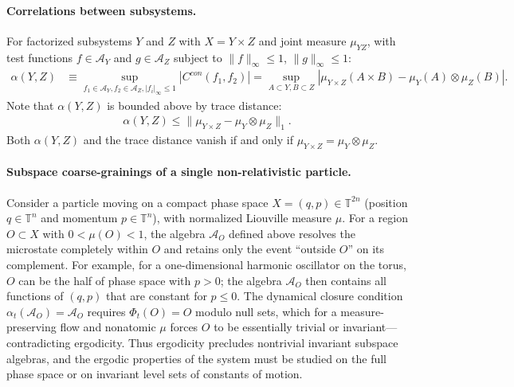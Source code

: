 \documentclass[a4paper,11pt]{article}
\theoremstyle{definition}
\theoremstyle{remark}
\newcommand{\mA}{\mathcal{A}}
\begin{document}
\paragraph{Correlations between subsystems.}
For factorized subsystems $Y$ and $Z$ with $X=Y\times Z$ and joint measure $\mu_{YZ}$,
with test functions $f\in\mathcal{A}_Y$ and $g\in\mathcal{A}_Z$ subject to
$\|f\|_\infty\le1$, $\|g\|_\infty\le1$:
\begin{align}
     \alpha(Y,Z)&\equiv \sup_{f_1\in \mA_Y, f_2\in \mA_Z, |f_i|_\infty\leq 1}|C^{con}(f_1,f_2)|
     =\sup_{A\subset Y,B\subset Z}|\mu_{Y\times Z}(A\times B)-\mu_Y(A)\otimes \mu_Z(B)|.
\end{align}
Note that $\alpha(Y,Z)$ is bounded above by trace distance:
\begin{align}
    \alpha(Y,Z)\leq \|\mu_{Y\times Z}-\mu_Y\otimes \mu_Z\|_1.
\end{align}
Both $\alpha(Y,Z)$ and the trace distance vanish if and only if $\mu_{Y\times Z}=\mu_Y\otimes\mu_Z$.
 
\paragraph{Subspace coarse-grainings of a single non-relativistic particle.}
Consider a particle moving on a compact phase space $X=(q,p)\in\mathbb{T}^{2n}$
(position $q\in\mathbb{T}^n$ and momentum $p\in\mathbb{T}^n$), with normalized
Liouville measure $\mu$.  For a region $O\subset X$ with $0<\mu(O)<1$, the algebra
$\mA_O$ defined above resolves the microstate completely within $O$ and retains only
the event ``outside $O$'' on its complement.  For example, for a one-dimensional
harmonic oscillator on the torus, $O$ can be the half of phase space with $p>0$; the
algebra $\mA_O$ then contains all functions of $(q,p)$ that are constant for $p\le0$.
The dynamical closure condition $\alpha_t(\mA_O)=\mA_O$ requires $\Phi_t(O)=O$ modulo
null sets, which for a measure-preserving flow and nonatomic $\mu$ forces $O$ to be
essentially trivial or invariant—contradicting ergodicity.  Thus ergodicity precludes
nontrivial invariant subspace algebras, and the ergodic properties of the system must
be studied on the full phase space or on invariant level sets of constants of motion.
 
\end{document}
